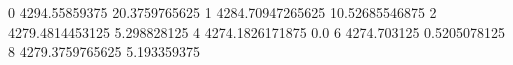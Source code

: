 0 4294.55859375 20.3759765625
1 4284.70947265625 10.52685546875
2 4279.4814453125 5.298828125
4 4274.1826171875 0.0
6 4274.703125 0.5205078125
8 4279.3759765625 5.193359375
